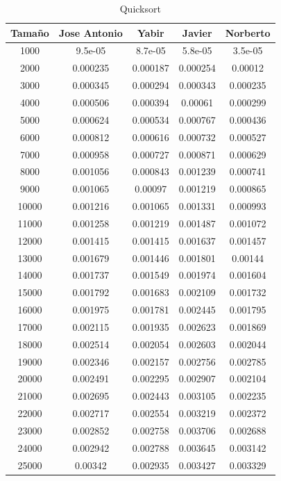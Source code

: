 \documentclass[11pt,a4paper]{article}
\begin{document}
\begin{table}[h]
	\centering
	\caption{Quicksort}
	\begin{tabular}{ | c | c  | c | c | c | }
		\hline
		Tama\~no & Jose Antonio & Yabir & Javier & Norberto\\ 
		\hline
		1000	&	9.5e-05	&	8.7e-05	&	5.8e-05	&	3.5e-05	\\
		2000	&	0.000235	&	0.000187	&	0.000254	&	0.00012	\\
		3000	&	0.000345	&	0.000294	&	0.000343	&	0.000235	\\
		4000	&	0.000506	&	0.000394	&	0.00061	&	0.000299	\\
		5000	&	0.000624	&	0.000534	&	0.000767	&	0.000436	\\
		6000	&	0.000812	&	0.000616	&	0.000732	&	0.000527	\\
		7000	&	0.000958	&	0.000727	&	0.000871	&	0.000629	\\
		8000	&	0.001056	&	0.000843	&	0.001239	&	0.000741	\\
		9000	&	0.001065	&	0.00097	&	0.001219	&	0.000865	\\
		10000	&	0.001216	&	0.001065	&	0.001331	&	0.000993	\\
		11000	&	0.001258	&	0.001219	&	0.001487	&	0.001072	\\
		12000	&	0.001415	&	0.001415	&	0.001637	&	0.001457	\\
		13000	&	0.001679	&	0.001446	&	0.001801	&	0.00144	\\
		14000	&	0.001737	&	0.001549	&	0.001974	&	0.001604	\\
		15000	&	0.001792	&	0.001683	&	0.002109	&	0.001732	\\
		16000	&	0.001975	&	0.001781	&	0.002445	&	0.001795	\\
		17000	&	0.002115	&	0.001935	&	0.002623	&	0.001869	\\
		18000	&	0.002514	&	0.002054	&	0.002603	&	0.002044	\\
		19000	&	0.002346	&	0.002157	&	0.002756	&	0.002785	\\
		20000	&	0.002491	&	0.002295	&	0.002907	&	0.002104	\\
		21000	&	0.002695	&	0.002443	&	0.003105	&	0.002235	\\
		22000	&	0.002717	&	0.002554	&	0.003219	&	0.002372	\\
		23000	&	0.002852	&	0.002758	&	0.003706	&	0.002688	\\
		24000	&	0.002942	&	0.002788	&	0.003645	&	0.003142	\\
		25000	&	0.00342	&	0.002935	&	0.003427	&	0.003329	\\
		\hline
	\end{tabular}
\end{table}
\end{document}
